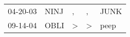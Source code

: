 \begin{supertabular}{lllll}
 04-20-03 &  NINJ &             , &             , &  JUNK \\
 09-14-04 &  OBLI &  \textgreater &  \textgreater &  peep \\
\end{supertabular}
